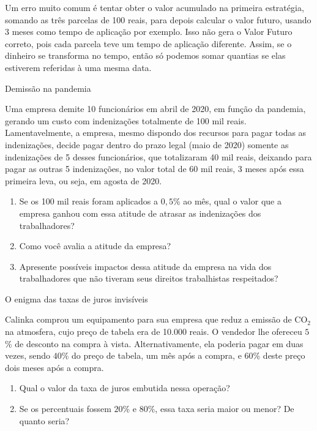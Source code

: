 Um erro muito comum é tentar obter o valor acumulado na primeira estratégia, somando as três parcelas de 100 reais, para depois calcular o valor futuro, usando 3 meses como tempo de aplicação por exemplo. Isso não gera o Valor Futuro correto, pois cada parcela teve um tempo de aplicação diferente. Assim, se o dinheiro se transforma no tempo, então só podemos somar quantias se elas estiverem referidas à uma mesma data.

\label{fin-prac-4}

\begin{task}{Demissão na pandemia}
\label{fin-ativ-19}

Uma empresa demite 10 funcionários em abril de 2020, em função da pandemia, gerando um custo com indenizações totalmente de 100 mil reais. Lamentavelmente, a empresa, mesmo dispondo dos recursos para pagar todas as indenizações, decide pagar dentro do prazo legal (maio de 2020) somente as indenizações de 5 desses funcionários, que totalizaram 40 mil reais, deixando para pagar as outras 5 indenizações, no valor total de 60 mil reais, 3 meses após essa primeira leva, ou seja, em agosta de 2020.
\begin{enumerate}
  \item Se os 100 mil reais foram aplicados a $0{,}5$\% ao mês, qual o valor que a empresa ganhou com essa atitude de atrasar as indenizações dos trabalhadores?
  \item Como você avalia a atitude da empresa?
  \item Apresente possíveis impactos dessa atitude da empresa na vida dos trabalhadores que não tiveram seus direitos trabalhistas respeitados?
\end{enumerate}
\end{task}


\begin{task}{O enigma das taxas de juros invisíveis}
\label{fin-ativ-20}

Calinka comprou um equipamento para sua empresa que reduz a emissão de CO$_2$ na atmosfera, cujo preço de tabela era de 10.000 reais. O vendedor lhe ofereceu $5$\% de desconto na compra à vista. Alternativamente, ela poderia pagar em duas vezes, sendo $40$\% do preço de tabela, um mês após a compra, e $60$\% deste preço dois meses após a compra.
\begin{enumerate}
  \item Qual o valor da taxa de juros embutida nessa operação?
  \item Se os percentuais fossem $20$\% e $80$\%, essa taxa seria maior ou menor? De quanto seria?
\end{enumerate}
\end{task}

